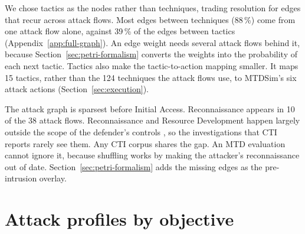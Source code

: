 \documentclass{cshonours}
\begin{document}
We chose tactics as the nodes rather than techniques, trading resolution
for edges that recur across attack flows. Most edges between techniques
(88\,\%) come from one attack flow alone, against 39\,\% of the edges
between tactics (Appendix~\ref{app:full-graph}). An edge
weight needs several attack flows behind it, because
Section~\ref{sec:petri-formalism} converts the weights into the probability of
each next tactic. Tactics also make the tactic-to-action mapping smaller. It maps 15 tactics,
rather than the 124 techniques the attack flows use, to MTDSim's six attack
actions (Section~\ref{sec:execution}).

The attack graph is sparsest before Initial Access. Reconnaissance appears
in 10 of the 38 attack flows. Reconnaissance and Resource Development
happen largely outside the scope of the defender's controls
\citep{mitre2026attackkb}, so the investigations that CTI reports rarely
see them. Any CTI corpus shares the gap. An MTD evaluation cannot
ignore it, because shuffling works by making the attacker's reconnaissance
out of date. Section~\ref{sec:petri-formalism} adds the missing edges as
the pre-intrusion overlay.

\section{Attack profiles by objective}
\label{sec:attack-profiles}
\end{document}
